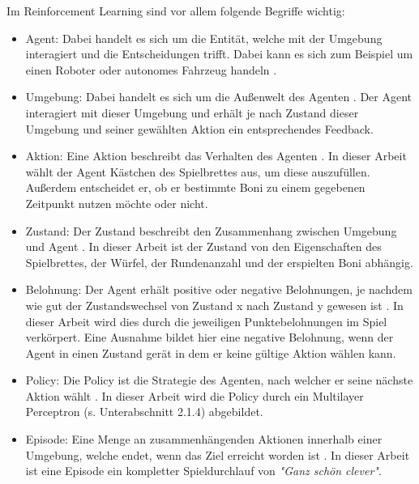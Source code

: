 Im Reinforcement Learning sind vor allem folgende Begriffe wichtig:

\begin{itemize}
\item Agent: Dabei handelt es sich um die Entität, welche mit der Umgebung interagiert und die Entscheidungen trifft. Dabei kann es sich zum Beispiel um einen Roboter oder autonomes Fahrzeug handeln \cite[S. 11]{ris-ala_fundamentals_2023}.

\item Umgebung: Dabei handelt es sich um die Außenwelt des Agenten \cite[S. 11]{ris-ala_fundamentals_2023}. Der Agent interagiert mit dieser Umgebung und erhält je nach Zustand dieser Umgebung und seiner gewählten Aktion ein entsprechendes Feedback.

\item Aktion: Eine Aktion beschreibt das Verhalten des Agenten \cite[S. 11]{ris-ala_fundamentals_2023}. In dieser Arbeit wählt der Agent Kästchen des Spielbrettes aus, um diese auszufüllen. Außerdem entscheidet er, ob er bestimmte Boni zu einem gegebenen Zeitpunkt nutzen möchte oder nicht.

\item Zustand: Der Zustand beschreibt den Zusammenhang zwischen Umgebung und Agent \cite[S. 11]{ris-ala_fundamentals_2023}. In dieser Arbeit ist der Zustand von den Eigenschaften des Spielbrettes, der Würfel, der Rundenanzahl und der erspielten Boni abhängig.

\item Belohnung: Der Agent erhält positive oder negative Belohnungen, je nachdem wie gut der Zustandswechsel von Zustand x nach Zustand y gewesen ist \cite[S. 11]{ris-ala_fundamentals_2023}. In dieser Arbeit wird dies durch die jeweiligen Punktebelohnungen im Spiel verkörpert. Eine Ausnahme bildet hier eine negative Belohnung, wenn der Agent in einen Zustand gerät in dem er keine gültige Aktion wählen kann.

\item Policy: Die Policy ist die Strategie des Agenten, nach welcher er seine nächste Aktion wählt \cite[S. 11]{ris-ala_fundamentals_2023}. In dieser Arbeit wird die Policy durch ein Multilayer Perceptron (s. Unterabschnitt 2.1.4) abgebildet.

\item Episode: Eine Menge an zusammenhängenden Aktionen innerhalb einer Umgebung, welche endet, wenn das Ziel erreicht worden ist \cite[S. 11]{ris-ala_fundamentals_2023}. In dieser Arbeit ist eine Episode ein kompletter Spieldurchlauf von \textit{"Ganz schön clever"}.
\end{itemize}

